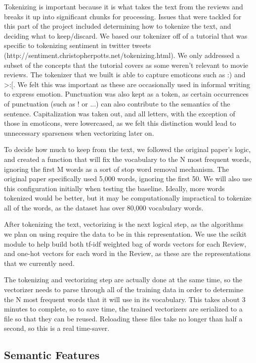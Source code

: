 \documentclass[11pt,letterpaper]{article}
\begin{document}
Tokenizing is important because it is what takes the text from the reviews and breaks it up into significant chunks for processing. Issues that were tackled for this part of the project included determining how to tokenize the text, and deciding what to keep/discard. We based our tokenizer off of a tutorial that was specific to tokenizing sentiment in twitter tweets (http://sentiment.christopherpotts.net/tokenizing.html). We only addressed a subset of the concepts that the tutorial covers as some weren't relevant to movie reviews. The tokenizer that we built is able to capture emoticons such as :) and >:[. We felt this was important as these are occasionally used in informal writing to express emotion. Punctuation was also kept as a token, as certain occurrences of punctuation (such as ! or ...) can also contribute to the semantics of the sentence. Capitalization was taken out, and all letters, with the exception of those in emoticons, were lowercased, as we felt this distinction would lead to unnecessary sparseness when vectorizing later on.

To decide how much to keep from the text, we followed the original paper's logic, and created a function that will fix the vocabulary to the N most frequent words, ignoring the first M words as a sort of stop word removal mechanism. The original paper specifically used 5,000 words, ignoring the first 50. We will also use this configuration initially when testing the baseline. Ideally, more words tokenized would be better, but it may be computationally impractical to tokenize all of the words, as the dataset has over 80,000 vocabulary words.

After tokenizing the text, vectorizing is the next logical step, as the algorithms we plan on using require the data to be in this representation. We use the scikit module to help build both tf-idf weighted bag of words vectors for each Review, and one-hot vectors for each word in the Review, as these are the representations that we currently need.

The tokenizing and vectorizing step are actually done at the same time, so the vectorizer needs to parse through all of the training data in order to determine the N most frequent words that it will use in its vocabulary. This takes about 3 minutes to complete, so to save time, the trained vectorizers are serialized to a file so that they can be reused. Reloading these files take no longer than half a second, so this is a real time-saver.


\subsection{Semantic Features}
\end{document}

